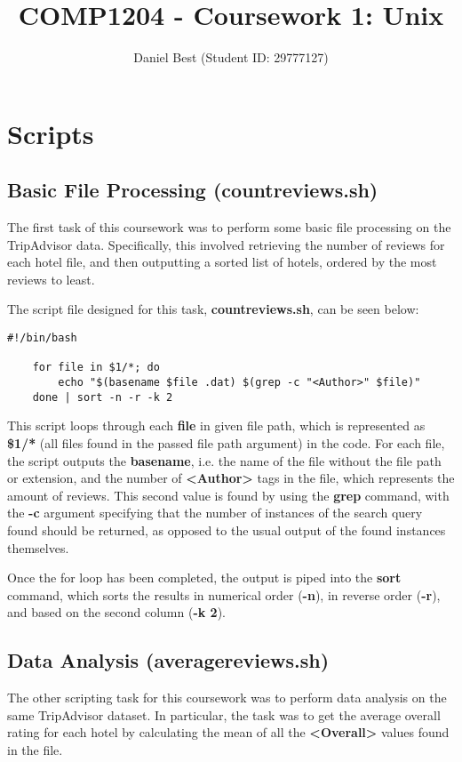 \documentclass{article}
\title{COMP1204 - Coursework 1: Unix}
\author{Daniel Best (Student ID: 29777127)}
\begin{document}
	
	\maketitle
	
	\newpage
	\section{Scripts}
	
	\subsection{Basic File Processing (countreviews.sh)}
	The first task of this coursework was to perform some basic file processing on the TripAdvisor data. Specifically, this involved retrieving the number of reviews for each hotel file, and then outputting a sorted list of hotels, ordered by the most reviews to least. \newline
	
	\noindent
	The script file designed for this task, \textbf{countreviews.sh}, can be seen below:
	
	\begin{lstlisting}[caption={countreviews.sh}, captionpos=b]
	#!/bin/bash
	
	for file in $1/*; do	
		echo "$(basename $file .dat) $(grep -c "<Author>" $file)"
	done | sort -n -r -k 2
	\end{lstlisting}

	\noindent
	This script loops through each \textbf{file} in given file path, which is represented as \textbf{\$1/*} (all files found in the passed file path argument) in the code. For each file, the script outputs the \textbf{basename}, i.e. the name of the file without the file path or extension, and the number of \textbf{{\textless}Author\textgreater} tags in the file, which represents the amount of reviews. This second value is found by using the \textbf{grep} command, with the \textbf{-c} argument specifying that the number of instances of the search query found should be returned, as opposed to the usual output of the found instances themselves. \newline
	
	\noindent
	Once the for loop has been completed, the output is piped into the \textbf{sort} command, which sorts the results in numerical order (\textbf{-n}), in reverse order (\textbf{-r}), and based on the second column (\textbf{-k 2}).
	
	\newpage
	\subsection{Data Analysis (averagereviews.sh)}
	The other scripting task for this coursework was to perform data analysis on the same TripAdvisor dataset. In particular, the task was to get the average overall rating for each hotel by calculating the mean of all the \textbf{{\textless}Overall\textgreater} values found in the file. \newline
	
\end{document}
